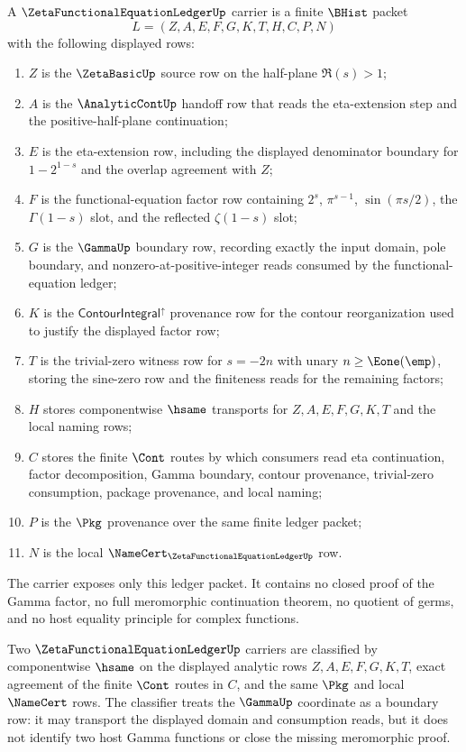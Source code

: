 \begin{definition}
\label{def:zeta-functional-equation-ledger-carrier}
A $\ZetaFunctionalEquationLedgerUp$ carrier is a finite $\BHist$ packet
$$
L=(Z,A,E,F,G,K,T,H,C,P,N)
$$
with the following displayed rows:
\begin{enumerate}
\item $Z$ is the $\ZetaBasicUp$ source row on the half-plane $\Re(s)>1$;
\item $A$ is the $\AnalyticContUp$ handoff row that reads the eta-extension step and the positive-half-plane continuation;
\item $E$ is the eta-extension row, including the displayed denominator boundary for $1-2^{1-s}$ and the overlap agreement with $Z$;
\item $F$ is the functional-equation factor row containing $2^s$, $\pi^{s-1}$, $\sin(\pi s/2)$, the $\Gamma(1-s)$ slot, and the reflected $\zeta(1-s)$ slot;
\item $G$ is the $\GammaUp$ boundary row, recording exactly the input domain, pole boundary, and nonzero-at-positive-integer reads consumed by the functional-equation ledger;
\item $K$ is the $\mathsf{ContourIntegral}^{\uparrow}$ provenance row for the contour reorganization used to justify the displayed factor row;
\item $T$ is the trivial-zero witness row for $s=-2n$ with unary $n\geq \Eone(\emp)$, storing the sine-zero row and the finiteness reads for the remaining factors;
\item $H$ stores componentwise $\hsame$ transports for $Z,A,E,F,G,K,T$ and the local naming rows;
\item $C$ stores the finite $\Cont$ routes by which consumers read eta continuation, factor decomposition, Gamma boundary, contour provenance, trivial-zero consumption, package provenance, and local naming;
\item $P$ is the $\Pkg$ provenance over the same finite ledger packet;
\item $N$ is the local $\NameCert_{\ZetaFunctionalEquationLedgerUp}$ row.
\end{enumerate}
The carrier exposes only this ledger packet. It contains no closed proof of the Gamma factor, no full meromorphic continuation theorem, no quotient of germs, and no host equality principle for complex functions.
\end{definition}

\begin{definition}
\label{def:zeta-functional-equation-ledger-classifier}
Two $\ZetaFunctionalEquationLedgerUp$ carriers are classified by componentwise $\hsame$ on the displayed analytic rows $Z,A,E,F,G,K,T$, exact agreement of the finite $\Cont$ routes in $C$, and the same $\Pkg$ and local $\NameCert$ rows. The classifier treats the $\GammaUp$ coordinate as a boundary row: it may transport the displayed domain and consumption reads, but it does not identify two host Gamma functions or close the missing meromorphic proof.
\end{definition}

